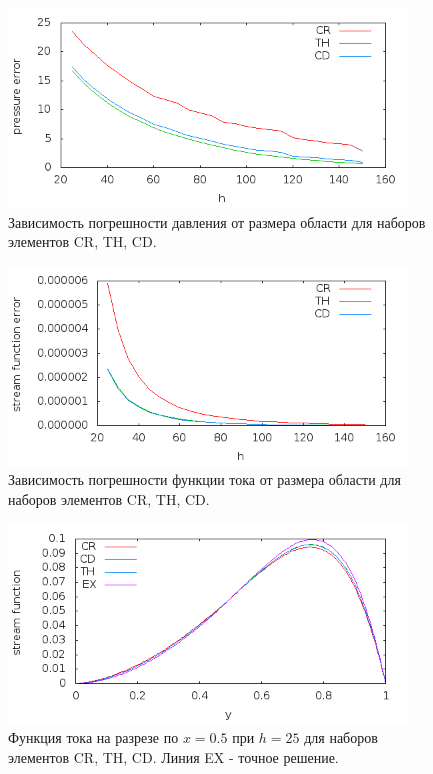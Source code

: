 \documentclass[12pt]{article}
\begin{document}
\begin{figure}
	\begin{center}
		\includegraphics[width=400px]{pics/p_err}
		\caption{Зависимость погрешности давления от размера области для наборов элементов CR, TH, CD.}
		\label{fg:p_err}
	\end{center}
\end{figure}

\begin{figure}
	\begin{center}
		\includegraphics[width=400px]{pics/psi_err}
		\caption{Зависимость погрешности функции тока от размера области для наборов элементов CR, TH, CD.}
		\label{fg:psi_err}
	\end{center}
\end{figure}

\begin{figure}
	\begin{center}
		\includegraphics[width=400px]{pics/psi_25}
		\caption{Функция тока на разрезе по $x=0.5$ при $h=25$ для наборов элементов CR, TH, CD. Линия EX - точное решение.}
		\label{fg:psi_25}
	\end{center}
\end{figure}
\end{document}
